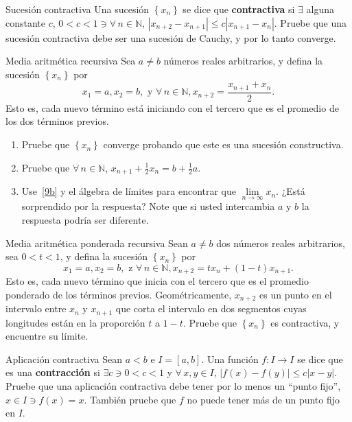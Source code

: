 \begin{prob}{Sucesión contractiva}
	Una sucesión $\left\{x_{n}\right\}$ se dice que \textbf{contractiva} si $\exists$ alguna constante $c$, $0<c<1\ni\forall\,n\in\mathds{N}$, $|x_{n+2}-x_{n+1}|\leq c|x_{n+1}-x_{n}|$. Pruebe que una sucesión contractiva debe ser una sucesión de Cauchy, y por lo tanto converge.
\end{prob}

\begin{prob}{Media aritmética recursiva}
Sea $a\neq b$ números reales arbitrarios, y defina la sucesión $\left\{x_{n}\right\}$ por \[ x_{1}=a,x_{2}=b,\text{ y }\forall\,n\in\mathds{N},x_{n+2}=\frac{x_{n+1}+x_{n}}{2}. \] Esto es, cada nuevo término está iniciando con el tercero que es el promedio de los dos términos previos.
	\begin{enumerate}
		\item Pruebe que $\left\{x_{n}\right\}$ converge probando que este es una sucesión constructiva.
		\item Pruebe que $\forall\,n\in\mathds{N}$, $x_{n+1}+\frac{1}{2}x_{n}=b+\frac{1}{2}a$.\label{9b}
		\item Use~\ref{9b} y el álgebra de límites para encontrar que  $\lim\limits_{n\to\infty}x_{n}$. ¿Está sorprendido por la respuesta? Note que si usted intercambia $a$ y $b$ la respuesta podría ser diferente.
	\end{enumerate}
\end{prob}

\begin{prob}{Media aritmética ponderada recursiva}
	Sean $a\neq b$ dos números reales arbitrarios, sea $0<t<1$, y defina la sucesión $\left\{x_{n}\right\}$ por \[ x_{1}=a,x_{2}=b,\text{ z }\forall\,n\in\mathds{N},x_{n+2}=tx_{n}+\left(1-t\right)x_{n+1}. \] Esto es, cada nuevo término que inicia con el tercero que es el promedio ponderado de los términos previos. Geométricamente, $x_{n+2}$ es un punto en el intervalo entre $x_{n}$ y $x_{n+1}$ que corta el intervalo en dos segmentos cuyas longitudes están en la proporción $t$ a $1-t$. Pruebe que $\left\{x_{n}\right\}$ es contractiva, y encuentre su límite.
\end{prob}

\begin{prob}{Aplicación contractiva}
	Sean $a<b$ e $I=\left[a,b\right]$. Una función $f\colon I\rightarrow I$ se dice que es una \textbf{contracción} si $\exists c\ni0<c<1$ y $\forall\,x,y\in I$, $|f\left(x\right)-f\left(y\right)|\leq c|x-y|$. Pruebe que una aplicación contractiva debe tener por lo menos un ``punto fijo'', $x\in I\ni f\left(x\right)=x$. También pruebe que $f$ no puede tener más de un punto fijo en $I$.
\end{prob}

